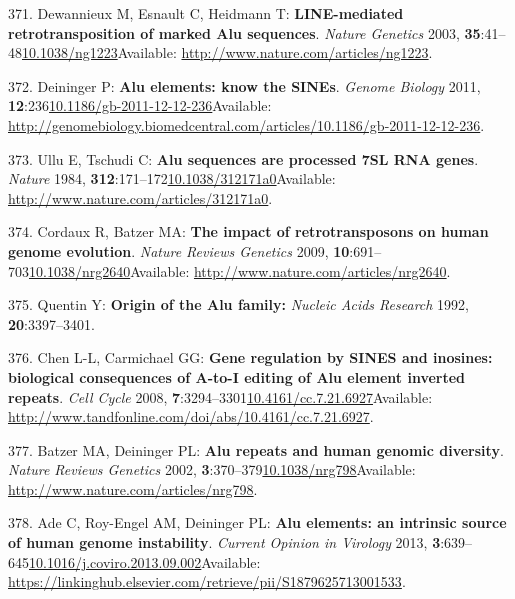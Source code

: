 \documentclass[
]{book}
\begin{document}
\leavevmode\hypertarget{ref-Dewannieux2003}{}%
371. Dewannieux M, Esnault C, Heidmann T: \textbf{LINE-mediated retrotransposition of marked Alu sequences}. \emph{Nature Genetics} 2003, \textbf{35}:41--48\href{https://doi.org/10.1038/ng1223}{10.1038/ng1223}Available: \url{http://www.nature.com/articles/ng1223}.

\leavevmode\hypertarget{ref-Deininger2011}{}%
372. Deininger P: \textbf{Alu elements: know the SINEs}. \emph{Genome Biology} 2011, \textbf{12}:236\href{https://doi.org/10.1186/gb-2011-12-12-236}{10.1186/gb-2011-12-12-236}Available: \url{http://genomebiology.biomedcentral.com/articles/10.1186/gb-2011-12-12-236}.

\leavevmode\hypertarget{ref-Ullu1984}{}%
373. Ullu E, Tschudi C: \textbf{Alu sequences are processed 7SL RNA genes}. \emph{Nature} 1984, \textbf{312}:171--172\href{https://doi.org/10.1038/312171a0}{10.1038/312171a0}Available: \url{http://www.nature.com/articles/312171a0}.

\leavevmode\hypertarget{ref-Cordaux2009}{}%
374. Cordaux R, Batzer MA: \textbf{The impact of retrotransposons on human genome evolution}. \emph{Nature Reviews Genetics} 2009, \textbf{10}:691--703\href{https://doi.org/10.1038/nrg2640}{10.1038/nrg2640}Available: \url{http://www.nature.com/articles/nrg2640}.

\leavevmode\hypertarget{ref-Quentin1992}{}%
375. Quentin Y: \textbf{Origin of the Alu family:} \emph{Nucleic Acids Research} 1992, \textbf{20}:3397--3401.

\leavevmode\hypertarget{ref-Chen2008}{}%
376. Chen L-L, Carmichael GG: \textbf{Gene regulation by SINES and inosines: biological consequences of A-to-I editing of Alu element inverted repeats}. \emph{Cell Cycle} 2008, \textbf{7}:3294--3301\href{https://doi.org/10.4161/cc.7.21.6927}{10.4161/cc.7.21.6927}Available: \url{http://www.tandfonline.com/doi/abs/10.4161/cc.7.21.6927}.

\leavevmode\hypertarget{ref-Batzer2002}{}%
377. Batzer MA, Deininger PL: \textbf{Alu repeats and human genomic diversity}. \emph{Nature Reviews Genetics} 2002, \textbf{3}:370--379\href{https://doi.org/10.1038/nrg798}{10.1038/nrg798}Available: \url{http://www.nature.com/articles/nrg798}.

\leavevmode\hypertarget{ref-Ade2013}{}%
378. Ade C, Roy-Engel AM, Deininger PL: \textbf{Alu elements: an intrinsic source of human genome instability}. \emph{Current Opinion in Virology} 2013, \textbf{3}:639--645\href{https://doi.org/10.1016/j.coviro.2013.09.002}{10.1016/j.coviro.2013.09.002}Available: \url{https://linkinghub.elsevier.com/retrieve/pii/S1879625713001533}.
\end{document}
